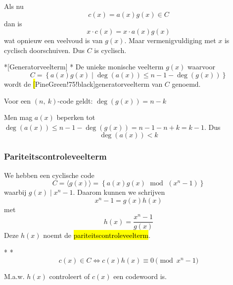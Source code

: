 Als nu
\begin{equation*}
    c(x) = a(x)g(x) \in C
\end{equation*}
dan is
\begin{equation*}
    x \cdot c(x) = x \cdot a(x) g(x)
\end{equation*}
wat opnieuw een veelvoud is van $g(x)$. Maar vermenigvuldiging met $x$ is cyclisch doorschuiven. Dus $C$ is cyclisch.

\begin{nicedefinition}*[Generatorveelterm]
    \nextpart[]*
    De unieke monische veelterm $g(x)$ waarvoor
    \begin{equation*}
        C = \left\{a(x)g(x) \mid \deg(a(x)) \le n-1-\deg(g(x))\right\}
    \end{equation*}
    wordt de \hl[PineGreen!75!black]{generatorveelterm} van $C$ genoemd.
\end{nicedefinition}

Voor een $(n,\ k)$-code geldt: $\boxed{\deg(g(x)) = n-k}$

Men mag $a(x)$ beperken tot $\deg(a(x)) \le n - 1 - \deg(g(x)) = n - 1 - n + k = k-1$. Dus
\begin{equation*}
    \boxed{\deg(a(x)) < k}
\end{equation*}

\subsubsection{Pariteitscontroleveelterm}

We hebben een cyclische code
\begin{equation*}
    C = \langle g(x) \rangle = \left\{ a(x)g(x) \;\text{ mod }\; (x^n-1) \right\}
\end{equation*}
waarbij $g(x) \mid x^n-1$. Daarom kunnen we schrijven
\begin{equation*}
    x^n-1 = g(x)h(x)
\end{equation*}
met 
\begin{equation*}
    h(x) = \frac{x^n-1}{g(x)}
\end{equation*}
Deze $h(x)$ noemt de \hl{pariteitscontroleveelterm}.

\begin{niceproperty}*
    \nextpart[]*
    \begin{equation*}
        c(x) \in C \iff c(x)h(x) \equiv 0 \pmod {x^n-1}
    \end{equation*}
\end{niceproperty}
M.a.w. $h(x)$ controleert of $c(x)$ een codewoord is.

